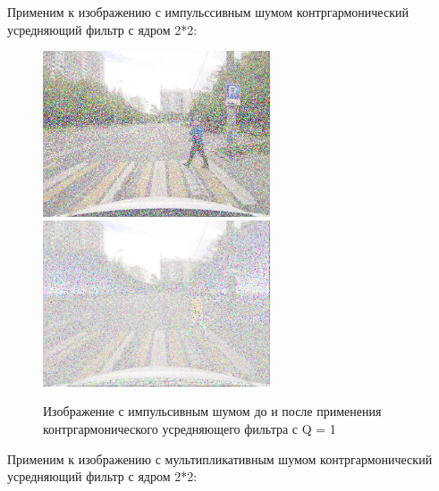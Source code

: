 Применим к изображению с импульссивным шумом контргармонический усредняющий фильтр с ядром 2*2:

\begin{figure}[hbt!]
    \centering
    \includegraphics[width=0.6\textwidth]{../outputs/image_impulse_noise.png}
    \includegraphics[width=0.6\textwidth]{../addition/image_impulse_countergarmonic_filter_Q1.png}
    \caption{Изображение с импульсивным шумом до и после применения контргармонического усредняющего фильтра с Q = 1}
    \label{fig:stich_images}
\end{figure}

Применим к изображению с мультипликативным шумом контргармонический усредняющий фильтр с ядром 2*2:

